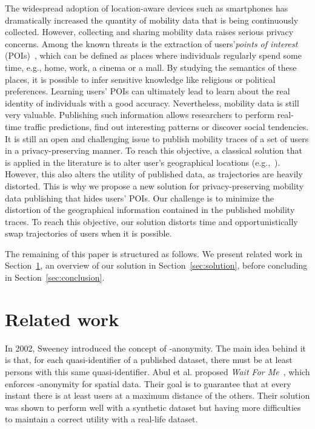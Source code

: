 \documentclass[10,conference,compsocconf]{IEEEtran}
\begin{document}
The widespread adoption of location-aware devices such as smartphones has dramatically increased the quantity of mobility data that is being continuously collected.
However, collecting and sharing mobility data raises serious privacy concerns.
Among the known threats is the extraction of users'\textit{points of interest} (POIs)~\cite{Gambs11}, which can be defined as places where individuals regularly spend some time, e.g., home, work, a cinema or a mall.
By studying the semantics of these places, it is possible to infer sensitive knowledge like religious or political preferences.
Learning users' POIs can ultimately lead to learn about the real identity of individuals with a good accuracy.
Nevertheless, mobility data is still very valuable.
Publishing such information allows researchers to perform real-time traffic predictions, find out interesting patterns or discover social tendencies.
It is still an open and challenging issue to publish mobility traces of a set of users in a privacy-preserving manner.
To reach this objective, a classical solution that is applied in the literature is to alter user's geographical locations (e.g.,~\cite{Andres13,Abul10}).
However, this also alters the utility of published data, as trajectories are heavily distorted.
This is why we propose a new solution for privacy-preserving mobility data publishing that hides users' POIs.
Our challenge is to minimize the distortion of the geographical information contained in the published mobility traces.
To reach this objective, our solution distorts time and opportunistically swap trajectories of users when it is possible.


The remaining of this paper is structured as follows. We present related work in Section~\ref{sec:related}, an overview of our solution in Section~\ref{sec:solution}, before concluding in Section~\ref{sec:conclusion}.
 \section{Related work}
\label{sec:related}

In 2002, Sweeney introduced the concept of -anonymity.
The main idea behind it is that, for each quasi-identifier of a published dataset, there must be at least  persons with this same quasi-identifier.
Abul et al. proposed \textit{Wait For Me}~\cite{Abul10}, which enforces -anonymity for spatial data.
Their goal is to guarantee that at every instant there is at least  users at a maximum distance  of the others.
Their solution was shown to perform well with a synthetic dataset but having more difficulties to maintain a correct utility with a real-life dataset.
\end{document}
